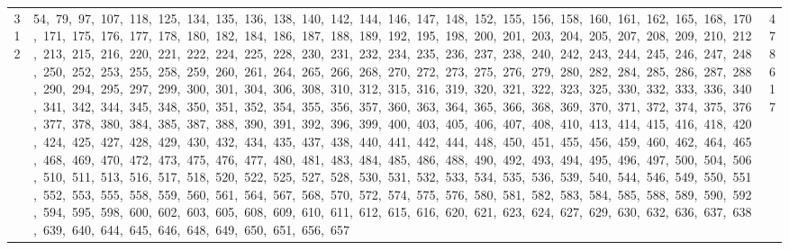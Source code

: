 \begin{longtable}{c|p{}|r}
312 & 54,\ 79,\ 97,\ 107,\ 118,\ 125,\ 134,\ 135,\ 136,\ 138,\ 140,\ 142,\ 144,\ 146,\ 147,\ 148,\ 152,\ 155,\ 156,\ 158,\ 160,\ 161,\ 162,\ 165,\ 168,\ 170,\ 171,\ 175,\ 176,\ 177,\ 178,\ 180,\ 182,\ 184,\ 186,\ 187,\ 188,\ 189,\ 192,\ 195,\ 198,\ 200,\ 201,\ 203,\ 204,\ 205,\ 207,\ 208,\ 209,\ 210,\ 212,\ 213,\ 215,\ 216,\ 220,\ 221,\ 222,\ 224,\ 225,\ 228,\ 230,\ 231,\ 232,\ 234,\ 235,\ 236,\ 237,\ 238,\ 240,\ 242,\ 243,\ 244,\ 245,\ 246,\ 247,\ 248,\ 250,\ 252,\ 253,\ 255,\ 258,\ 259,\ 260,\ 261,\ 264,\ 265,\ 266,\ 268,\ 270,\ 272,\ 273,\ 275,\ 276,\ 279,\ 280,\ 282,\ 284,\ 285,\ 286,\ 287,\ 288,\ 290,\ 294,\ 295,\ 297,\ 299,\ 300,\ 301,\ 304,\ 306,\ 308,\ 310,\ 312,\ 315,\ 316,\ 319,\ 320,\ 321,\ 322,\ 323,\ 325,\ 330,\ 332,\ 333,\ 336,\ 340,\ 341,\ 342,\ 344,\ 345,\ 348,\ 350,\ 351,\ 352,\ 354,\ 355,\ 356,\ 357,\ 360,\ 363,\ 364,\ 365,\ 366,\ 368,\ 369,\ 370,\ 371,\ 372,\ 374,\ 375,\ 376,\ 377,\ 378,\ 380,\ 384,\ 385,\ 387,\ 388,\ 390,\ 391,\ 392,\ 396,\ 399,\ 400,\ 403,\ 405,\ 406,\ 407,\ 408,\ 410,\ 413,\ 414,\ 415,\ 416,\ 418,\ 420,\ 424,\ 425,\ 427,\ 428,\ 429,\ 430,\ 432,\ 434,\ 435,\ 437,\ 438,\ 440,\ 441,\ 442,\ 444,\ 448,\ 450,\ 451,\ 455,\ 456,\ 459,\ 460,\ 462,\ 464,\ 465,\ 468,\ 469,\ 470,\ 472,\ 473,\ 475,\ 476,\ 477,\ 480,\ 481,\ 483,\ 484,\ 485,\ 486,\ 488,\ 490,\ 492,\ 493,\ 494,\ 495,\ 496,\ 497,\ 500,\ 504,\ 506,\ 510,\ 511,\ 513,\ 516,\ 517,\ 518,\ 520,\ 522,\ 525,\ 527,\ 528,\ 530,\ 531,\ 532,\ 533,\ 534,\ 535,\ 536,\ 539,\ 540,\ 544,\ 546,\ 549,\ 550,\ 551,\ 552,\ 553,\ 555,\ 558,\ 559,\ 560,\ 561,\ 564,\ 567,\ 568,\ 570,\ 572,\ 574,\ 575,\ 576,\ 580,\ 581,\ 582,\ 583,\ 584,\ 585,\ 588,\ 589,\ 590,\ 592,\ 594,\ 595,\ 598,\ 600,\ 602,\ 603,\ 605,\ 608,\ 609,\ 610,\ 611,\ 612,\ 615,\ 616,\ 620,\ 621,\ 623,\ 624,\ 627,\ 629,\ 630,\ 632,\ 636,\ 637,\ 638,\ 639,\ 640,\ 644,\ 645,\ 646,\ 648,\ 649,\ 650,\ 651,\ 656,\ 657 & 478617 \\

\end{longtable}
